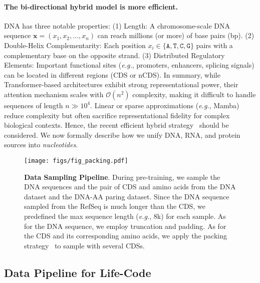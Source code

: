 \paragraph{The bi-directional hybrid model is more efficient.}
DNA has three notable properties:
(1) Length: A chromosome-scale DNA sequence \(\mathbf{x} = (x_1, x_2, \ldots, x_n)\) can reach millions (or more) of base pairs (bp).
(2) Double-Helix Complementarity: Each position \(x_i \in \{\texttt{A}, \texttt{T}, \texttt{C}, \texttt{G}\}\) pairs with a complementary base on the opposite strand.
(3) Distributed Regulatory Elements: Important functional sites (\textit{e.g.}, promoters, enhancers, splicing signals) can be located in different regions (CDS or nCDS). In summary,  while Transformer-based architectures exhibit strong representational power, their attention mechanism scales with \(\mathcal{O}(n^2)\) complexity, making it difficult to handle sequences of length \(n\gg 10^4\). Linear or sparse approximations (\textit{e.g.}, Mamba) reduce complexity but often sacrifice representational fidelity for complex biological contexts. Hence, the recent efficient hybrid strategy~\cite{yang2025deltanet,yang2024gateddelta,icml2024chela,ijcai2024longvq} should be considered.
We now formally describe how we unify DNA, RNA, and protein sources into \textit{nucleotides}.

\begin{figure}[b!]
    \vspace{-0.5em}
    \centering
    \texttt{[image: figs/fig\_packing.pdf]}
    \vspace{-2.0em}
    \caption{\textbf{Data Sampling Pipeline}. During pre-training, we sample the DNA sequences and the pair of CDS and amino acids from the DNA dataset and the DNA-AA paring dataset. Since the DNA sequence sampled from the RefSeq is much longer than the CDS, we predefined the max sequence length (\textit{e.g.}, 8k) for each sample. As for the DNA sequence, we employ truncation and padding. As for the CDS and its corresponding amino acids, we apply the packing strategy~\cite{Warner2024ModernBERT} to sample with several CDSs.
    }
    \label{fig:data_packing}
    \vspace{-0.5em}
\end{figure}

\subsection{Data Pipeline for Life-Code}
